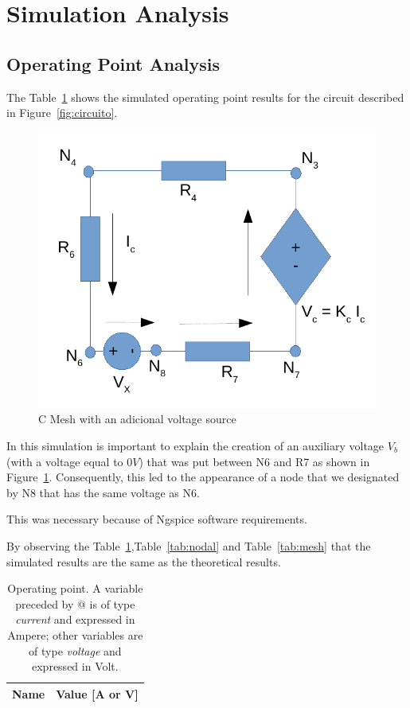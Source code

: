 \section{Simulation Analysis}
\label{sec:simulation}

\subsection{Operating Point Analysis}


The Table~\ref{tab:op} shows the simulated operating point results for the circuit described in Figure~\ref{fig:circuito}.

\begin{figure}[h] \centering
\includegraphics[width=0.6\linewidth]{malhaC.pdf}
\caption{C Mesh with an adicional voltage source} %
\label{fig:malhaC}
\end{figure}

In this simulation is important to explain the creation of an auxiliary voltage $V_b$ (with a voltage equal to $0V$) that was put between N6 and R7 as shown in Figure~\ref{fig:malhaC}. Consequently, this led to the appearance of a node that we designated by N8 that has the same voltage as N6.

This was necessary because of Ngspice software requirements.

By observing the Table~\ref{tab:op},Table~\ref{tab:nodal} and Table~\ref{tab:mesh} that the simulated results are the same as the theoretical results.%

\begin{table}[h]
  \centering
  \begin{tabular}{|l|r|}
    \hline    
    {\bf Name} & {\bf Value [A or V]} \\ \hline
    
  \end{tabular}
  \caption{Operating point. A variable preceded by @ is of type {\em current}
    and expressed in Ampere; other variables are of type {\it voltage} and expressed in
    Volt.}
  \label{tab:op}
\end{table}


